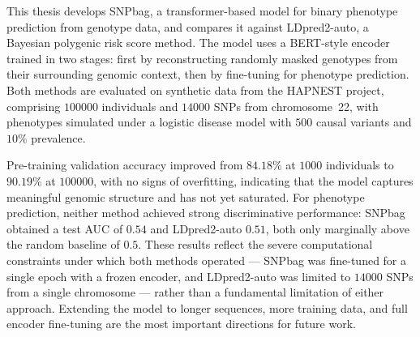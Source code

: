 This thesis develops SNPbag, a transformer-based model for binary
phenotype prediction from genotype data, and compares it against
LDpred2-auto, a Bayesian polygenic risk score method. The model uses a
BERT-style encoder trained in two stages: first by reconstructing
randomly masked genotypes from their surrounding genomic context, then
by fine-tuning for phenotype prediction. Both methods are evaluated on
synthetic data from the HAPNEST project, comprising $100000$
individuals and $14000$ SNPs from chromosome~22, with phenotypes
simulated under a logistic disease model with $500$ causal variants and
$10\%$ prevalence.

Pre-training validation accuracy improved from $84.18\%$ at $1000$
individuals to $90.19\%$ at $100000$, with no signs of overfitting,
indicating that the model captures meaningful genomic structure and has
not yet saturated. For phenotype prediction, neither method achieved
strong discriminative performance: SNPbag obtained a test AUC of $0.54$
and LDpred2-auto $0.51$, both only marginally above the random baseline
of $0.5$. These results reflect the severe computational constraints
under which both methods operated — SNPbag was fine-tuned for a single
epoch with a frozen encoder, and LDpred2-auto was limited to $14000$
SNPs from a single chromosome — rather than a fundamental limitation of
either approach. Extending the model to longer sequences, more training
data, and full encoder fine-tuning are the most important directions for
future work.